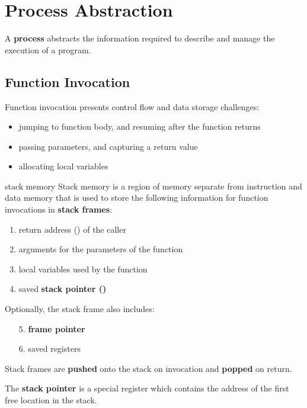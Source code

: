 \section{Process Abstraction}

A \textbf{process} abstracts the information required to describe and manage the execution of a program.

\subsection{Function Invocation}
Function invocation presents control flow and data storage challenges:
\begin{itemize}
    \item jumping to function body, and resuming after the function returns
    \item passing  parameters, and capturing a return value
    \item allocating local variables
\end{itemize}

\begin{defn}{stack memory}
    Stack memory is a region of memory separate from instruction and data memory that is used to store the following information for function invocations in \textbf{stack frames}:
    \begin{enumerate}
        \item return address () of the caller
        \item arguments for the parameters of the function
        \item local variables used by the function
        \item saved \textbf{stack pointer ()}
    \end{enumerate}

    Optionally, the stack frame also includes:
    \begin{enumerate}
        \item[5.] \textbf{frame pointer }
        \item[6.] saved registers
    \end{enumerate}
\end{defn}

Stack frames are \textbf{pushed} onto the stack on invocation and \textbf{popped} on return.

The \textbf{stack pointer } is a special register which contains the address of the first free location in the stack.

